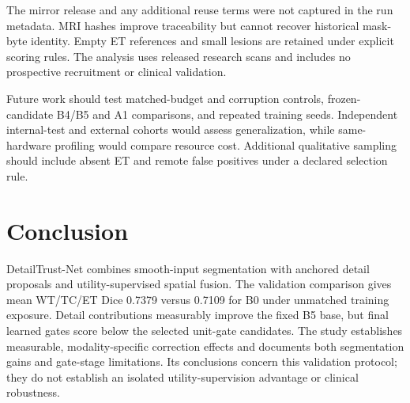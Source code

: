 \documentclass[conference]{IEEEtran}
\begin{document}
The mirror release and any additional reuse terms were not captured in the run metadata. MRI hashes improve traceability but cannot recover historical mask-byte identity. Empty ET references and small lesions are retained under explicit scoring rules. The analysis uses released research scans and includes no prospective recruitment or clinical validation.

Future work should test matched-budget and corruption controls, frozen-candidate B4/B5 and A1 comparisons, and repeated training seeds. Independent internal-test and external cohorts would assess generalization, while same-hardware profiling would compare resource cost. Additional qualitative sampling should include absent ET and remote false positives under a declared selection rule.

\section{Conclusion}
DetailTrust-Net combines smooth-input segmentation with anchored detail proposals and utility-supervised spatial fusion. The validation comparison gives mean WT/TC/ET Dice 0.7379 versus 0.7109 for B0 under unmatched training exposure. Detail contributions measurably improve the fixed B5 base, but final learned gates score below the selected unit-gate candidates. The study establishes measurable, modality-specific correction effects and documents both segmentation gains and gate-stage limitations. Its conclusions concern this validation protocol; they do not establish an isolated utility-supervision advantage or clinical robustness.
\end{document}
